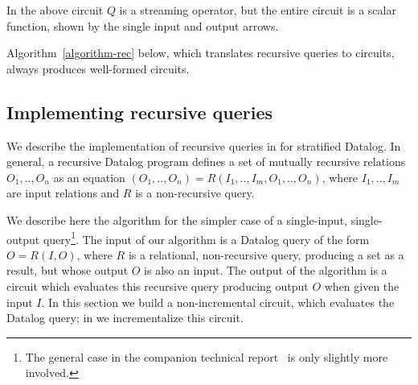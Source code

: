 \begin{center}
\end{center}

In the above circuit $Q$ is a streaming operator, but the entire
circuit is a scalar function, shown by the single input and output
arrows.

Algorithm~\ref{algorithm-rec} below, which translates recursive queries to
\dbsp circuits, always produces well-formed circuits.

\subsection{Implementing recursive queries}\label{sec:datalog}

We describe the implementation of recursive queries in \dbsp for
stratified Datalog.
In general, a recursive Datalog program defines a set of
mutually recursive relations $O_1,..,O_n$ as an equation
$(O_1,..,O_n)=R(I_1,..,I_m, O_1,..,O_n)$, where $I_1,..,I_m$ are
input relations and $R$ is a non-recursive query.

We describe here the algorithm for the simpler case of a single-input,
single-output query\footnote{The general case in the companion
technical report~\cite{tr} is only slightly more involved.}.  The
input of our algorithm is a Datalog query of the form $O = R(I, O)$,
where $R$ is a relational, non-recursive query, producing a set as a
result, but whose output $O$ is also an input.  The output of the
algorithm is a \dbsp circuit which evaluates this recursive query
producing output $O$ when given the input $I$.  In this section we
build a non-incremental circuit, which evaluates the Datalog query; in
 we incrementalize this circuit.

